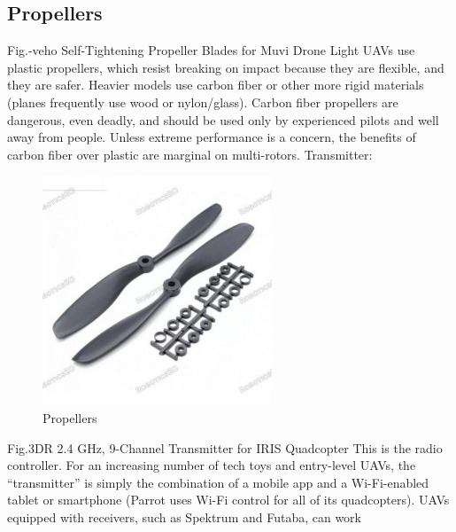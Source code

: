 \documentclass[conference]{IEEEtran}
\begin{document}
\subsection{Propellers}

Fig.-veho Self-Tightening Propeller Blades for Muvi Drone
Light UAVs use plastic propellers, which resist breaking on impact because they are flexible, and they are
safer. Heavier models use carbon fiber or other more rigid materials (planes frequently use wood or
nylon/glass). Carbon fiber propellers are dangerous, even deadly, and should be used only by experienced
pilots and well away from people. Unless extreme performance is a concern, the benefits of carbon fiber over
plastic are marginal on multi-rotors.
Transmitter:
\begin{figure}[th]
    \centering
    \includegraphics[width=\linewidth]{images/WhatsApp Image 2024-05-08 at 1.26.39 AM.jpeg}
    \caption{Propellers}
    \label{fig:enter-label}
\end{figure}
 Fig.3DR 2.4 GHz, 9-Channel Transmitter for IRIS Quadcopter
This is the radio controller. For an increasing number of tech toys and entry-level UAVs, the “transmitter” is
simply the combination of a mobile app and a Wi-Fi-enabled tablet or smartphone (Parrot uses Wi-Fi
control for all of its quadcopters). UAVs equipped with receivers, such as Spektrum and Futaba, can work
\end{document}
